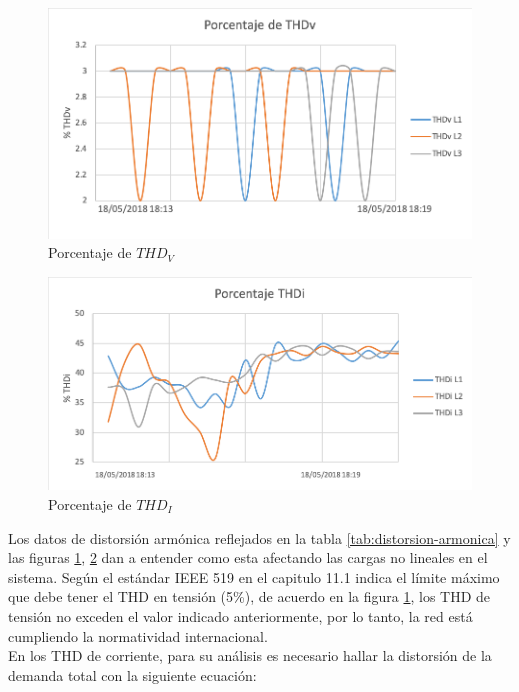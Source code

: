 \begin{figure}[H]
\centering
\includegraphics{2Marco/porcentaje-thdv}
\caption{Porcentaje de $THD_{V}$} 
\label{fig:porcentaje-thdv}
\end{figure} 

\begin{figure}[H]
\centering
\includegraphics{2Marco/porcentaje-thdi}
\caption{Porcentaje de $THD_{I}$} 
\label{fig:porcentaje-thdi}
\end{figure} 

Los datos de distorsión armónica reflejados en la tabla \ref{tab:distorsion-armonica} y las figuras \ref{fig:porcentaje-thdv}, \ref{fig:porcentaje-thdi} dan a entender como esta afectando las cargas no lineales en el sistema. Según el estándar IEEE 519 en el capitulo 11.1 indica el límite máximo que debe tener el THD en tensión (5\%), de acuerdo en la figura \ref{fig:porcentaje-thdv}, los THD de tensión no exceden el valor indicado anteriormente, por lo tanto, la red está cumpliendo la normatividad internacional.\\ 
En los THD de corriente, para su análisis es necesario hallar la distorsión de la demanda total con la siguiente ecuación:\\

